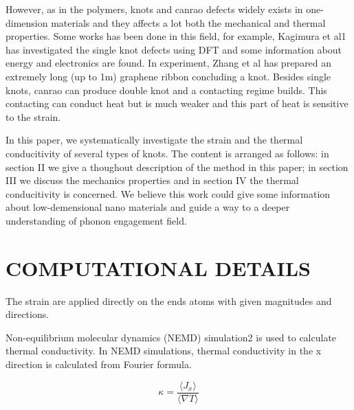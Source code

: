 \documentclass[%
 reprint,
 amsmath,amssymb,
 aps,
prb,
]{revtex4-1}
\begin{document}
However, as in the polymers, knots and canrao defects widely exists in one-dimension materials and they affects a lot both the mechanical and thermal properties. Some works has been done in this field, for example, Kagimura et al1 has investigated the single knot defects using DFT and some information about energy and electronics are found. In experiment, Zhang et al has prepared an extremely long (up to 1m) graphene ribbon concluding a knot. Besides single knots, canrao can produce double knot and a contacting regime builds. This contacting can conduct heat but is much weaker and this part of heat is sensitive to the strain.

In this paper, we systematically investigate the strain and the thermal conducitivity of several types of knots. The content is arranged as follows: in section II we give a thoughout description of the method in this paper; in section III we discuss the mechanics properties and in section IV the thermal conducitivity is concerned. We believe this work could give some information about low-demensional nano materials and guide a way to a deeper understanding of phonon engagement field.

\section{COMPUTATIONAL DETAILS}

The strain are applied directly on the ends atoms with given magnitudes and directions.

Non-equilibrium molecular dynamics (NEMD) simulation2 is used to calculate thermal conductivity. In NEMD simulations, thermal conductivity in the x direction is calculated from Fourier formula.

\begin{equation}
  \kappa = \frac{\langle J_x\rangle}{\langle \nabla T\rangle}
\end{equation}
\end{document}
